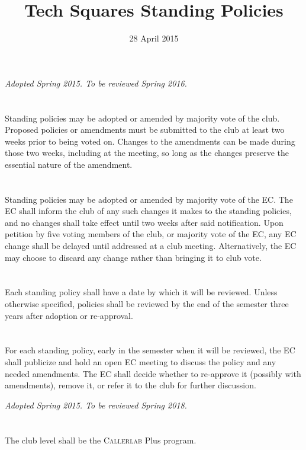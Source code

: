 \documentclass{bylaws}
\title{Tech Squares Standing Policies}
\date{28 April 2015}
\newcommand{\sptimes}[2]{\emph{Adopted #1. To be reviewed #2.}}
\begin{document}
\maketitle

\sptimes{Spring 2015}{Spring 2016}
\section{}Standing policies may be adopted or amended by majority vote of the club. Proposed policies or amendments must be submitted to the club at least two weeks prior to being voted on. Changes to the amendments can be made during those two weeks, including at the meeting, so long as the changes preserve the essential nature of the amendment.
\section{}Standing policies may be adopted or amended by majority vote of the EC. The EC shall inform the club of any such changes it makes to the standing policies, and no changes shall take effect until two weeks after said notification. Upon petition by five voting members of the club, or majority vote of the EC, any EC change shall be delayed until addressed at a club meeting. Alternatively, the EC may choose to discard any change rather than bringing it to club vote.
\section{}Each standing policy shall have a date by which it will be reviewed. Unless otherwise specified, policies shall be reviewed by the end of the semester three years after adoption or re-approval.
\section{}For each standing policy, early in the semester when it will be reviewed, the EC shall publicize and hold an open EC meeting to discuss the policy and any needed amendments. The EC shall decide whether to re-approve it (possibly with amendments), remove it, or refer it to the club for further discussion.


\sptimes{Spring 2015}{Spring 2018}
\section{}The club level shall be the \textsc{Callerlab} Plus program.
\end{document}
